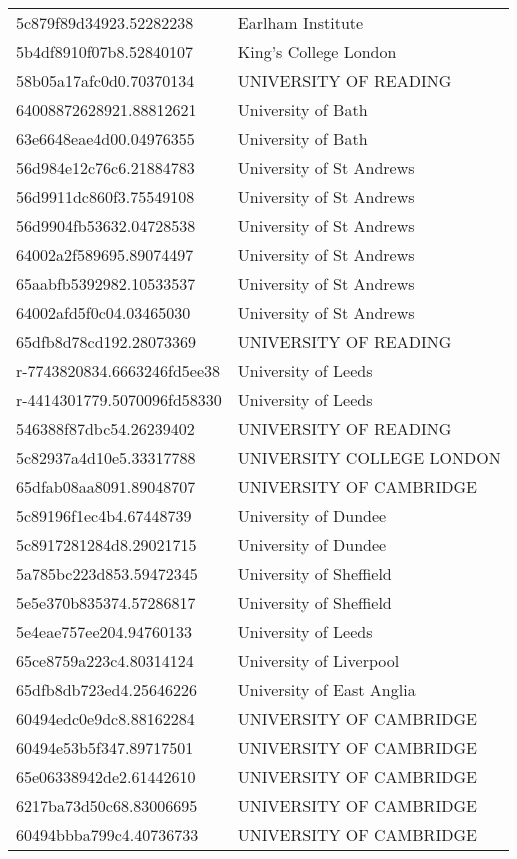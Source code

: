 \begin{tabular}{ll}
5c879f89d34923.52282238 & Earlham Institute \\
5b4df8910f07b8.52840107 & King's College London \\
58b05a17afc0d0.70370134 & UNIVERSITY OF READING \\
64008872628921.88812621 & University of Bath \\
63e6648eae4d00.04976355 & University of Bath \\
56d984e12c76c6.21884783 & University of St Andrews \\
56d9911dc860f3.75549108 & University of St Andrews \\
56d9904fb53632.04728538 & University of St Andrews \\
64002a2f589695.89074497 & University of St Andrews \\
65aabfb5392982.10533537 & University of St Andrews \\
64002afd5f0c04.03465030 & University of St Andrews \\
65dfb8d78cd192.28073369 & UNIVERSITY OF READING \\
r-7743820834.6663246fd5ee38 & University of Leeds \\
r-4414301779.5070096fd58330 & University of Leeds \\
546388f87dbc54.26239402 & UNIVERSITY OF READING \\
5c82937a4d10e5.33317788 & UNIVERSITY COLLEGE LONDON \\
65dfab08aa8091.89048707 & UNIVERSITY OF CAMBRIDGE \\
5c89196f1ec4b4.67448739 & University of Dundee \\
5c8917281284d8.29021715 & University of Dundee \\
5a785bc223d853.59472345 & University of Sheffield \\
5e5e370b835374.57286817 & University of Sheffield \\
5e4eae757ee204.94760133 & University of Leeds \\
65ce8759a223c4.80314124 & University of Liverpool \\
65dfb8db723ed4.25646226 & University of East Anglia \\
60494edc0e9dc8.88162284 & UNIVERSITY OF CAMBRIDGE \\
60494e53b5f347.89717501 & UNIVERSITY OF CAMBRIDGE \\
65e06338942de2.61442610 & UNIVERSITY OF CAMBRIDGE \\
6217ba73d50c68.83006695 & UNIVERSITY OF CAMBRIDGE \\
60494bbba799c4.40736733 & UNIVERSITY OF CAMBRIDGE \\

\end{tabular}
